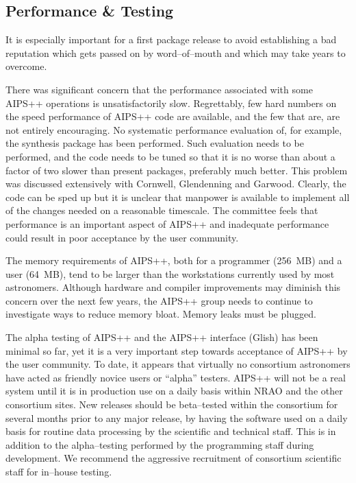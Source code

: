 \subsection{Performance \& Testing}

It is especially important for a first package release to avoid
establishing a bad reputation which gets passed on by word--of--mouth
and which may take years to overcome.

There was significant concern that the performance associated with
some AIPS++ operations is unsatisfactorily slow.  Regrettably, few
hard numbers on the speed performance of AIPS++ code are available,
and the few that are, are not entirely encouraging. No systematic
performance evaluation of, for example, the synthesis package has been
performed. Such evaluation needs to be performed, and the code needs
to be tuned so that it is no worse than about a factor of two slower
than present packages, preferably much better. This problem was
discussed extensively with Cornwell, Glendenning and Garwood.
Clearly, the code can be sped up but it is unclear that manpower is
available to implement all of the changes needed on a reasonable
timescale.  The committee feels that performance is an important aspect
of AIPS++ and inadequate performance could
result in poor acceptance by the user community.

The memory requirements of AIPS++, both for a programmer (256~MB) and
a user (64~MB), tend to be larger than the workstations currently used
by most astronomers. Although hardware and compiler improvements may
diminish this concern over the next few years, the AIPS++ group needs
to continue to investigate ways to reduce memory bloat. Memory leaks
must be plugged.

The alpha testing of AIPS++ and the AIPS++ interface (Glish) has been
minimal so far, yet it is a very important step towards acceptance of
AIPS++ by the user community.  To date, it appears that virtually no
consortium astronomers have acted as friendly novice users or
``alpha'' testers. AIPS++ will not be a real system until it is in
production use on a daily basis within NRAO and the other consortium
sites.  New releases should be beta--tested within the
consortium for several months prior to any major
release, by having the software used on a daily basis for routine
data processing by the scientific and technical staff.
This is in addition to the alpha--testing performed by the programming
staff during development. We recommend the aggressive recruitment of
consortium scientific staff for in--house testing.

